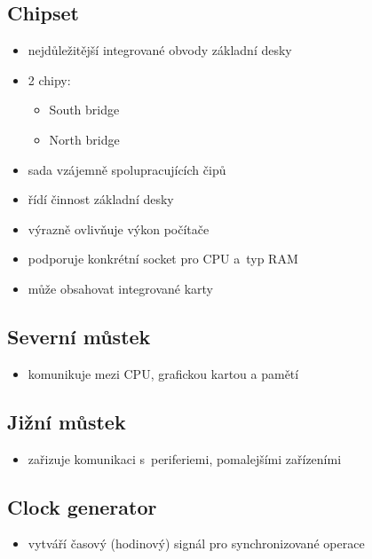 \documentclass[a4paper,12pt]{article}
\providecommand{\tightlist}{%
\setlength{\itemsep}{0pt}\setlength{\parskip}{0pt}}
\begin{document}
\subsection{Chipset}

\begin{itemize}
  \tightlist
  \item nejdůležitější integrované obvody základní desky
  \item 2 chipy:
  \begin{itemize}
    \tightlist
    \item South bridge
    \item North bridge
  \end{itemize}
  \item sada vzájemně spolupracujících čipů
  \item řídí činnost základní desky
  \item výrazně ovlivňuje výkon počítače
  \item podporuje konkrétní socket pro CPU a~typ RAM
  \item může obsahovat integrované karty
\end{itemize}

\subsection{Severní můstek}

\begin{itemize}
  \item komunikuje mezi CPU, grafickou kartou a pamětí
\end{itemize}

\subsection{Jižní můstek}

\begin{itemize}
  \item zařizuje komunikaci s~periferiemi, pomalejšími zařízeními
\end{itemize}

\subsection{Clock generator}

\begin{itemize}
  \item vytváří časový (hodinový) signál pro synchronizované operace
\end{itemize}
\end{document}
